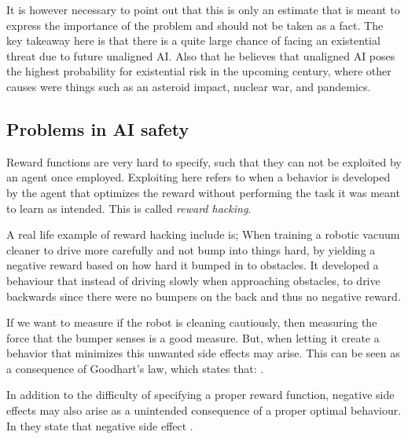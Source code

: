\documentclass[12pt,A4]{report}
\theoremstyle{definition}
\begin{document}
It is however necessary to point out that this is only an estimate that is meant to express the importance of the problem and should not be taken as a fact. The key takeaway here is that there is a quite large chance of facing an existential threat due to future unaligned AI. Also that he believes that unaligned AI poses the highest probability for existential risk in the upcoming century, where other causes were things such as an asteroid impact, nuclear war, and pandemics. 


\subsection{Problems in AI safety}
Reward functions are very hard to specify\autocite{Turner et al. (2020)}, such that they can not be exploited by an agent once employed. Exploiting here refers to when a behavior is developed by the agent that optimizes the reward without performing the task it was meant to learn as intended. This is called \textit{reward hacking}.

A real life example of reward hacking include is; When training a robotic vacuum cleaner to drive more carefully and not bump into things hard, by yielding a negative reward based on how hard it bumped in to obstacles. It developed a behaviour that instead of driving slowly when approaching obstacles, to drive backwards since there were no bumpers on the back and thus no negative reward\autocite{Custard Smingleigh}.

If we want to measure if the robot is cleaning cautiously, then measuring the force that the bumper senses is a good measure. But, when letting it create a behavior that minimizes this unwanted side effects may arise. This can be seen as a consequence of Goodhart's law, which states that: \autocite{Goodhars-wiki}. 

In addition to the difficulty of specifying a proper reward function, negative side effects may also arise as a unintended consequence of a proper optimal behaviour. In \autocite{Saisubramanian et al} they state that negative side effect . 
\end{document}

